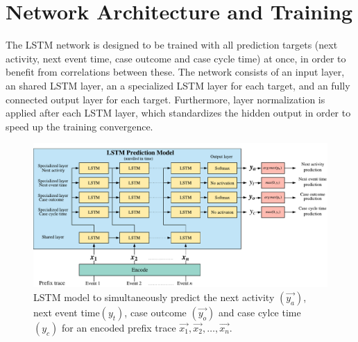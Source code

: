 \section{Network Architecture and Training}

The LSTM network is designed to be trained with all prediction targets (next activity, next event time, case outcome and case cycle time) at once, in order to benefit from correlations between these.
The network consists of an input layer, an shared LSTM layer, an a specialized LSTM layer for each target, and an fully connected output layer for each target.
Furthermore, layer normalization \cite{DBLP:journals/corr/BaKH16} is applied after each LSTM layer, which standardizes the hidden output in order to speed up the training convergence.

\begin{figure}[!htbp]
	\centering
	\includegraphics[width=\textwidth]{figures/network}
	\caption{LSTM model to simultaneously predict the next activity $(\vec{y_a})$, next event time$(y_t)$, case outcome $(\vec{y_o})$ and case cylce time $(y_c)$ for an encoded prefix trace $\vec{x_1}, \vec{x_2}, \dots, \vec{x_n}$.}
	\label{fig:network}
\end{figure}

